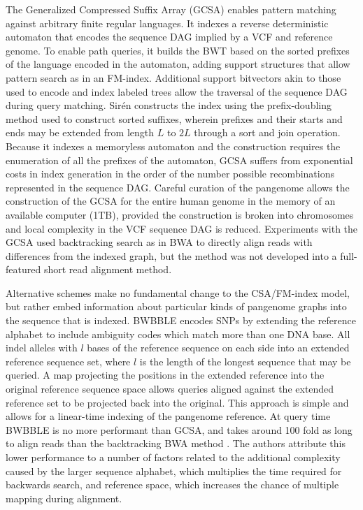 The Generalized Compressed Suffix Array (GCSA) \cite{siren2011indexing,siren2014indexing} enables pattern matching against arbitrary finite regular languages.
It indexes a reverse deterministic automaton that encodes the sequence DAG implied by a VCF and reference genome.
To enable path queries, it builds the BWT based on the sorted prefixes of the language encoded in the automaton, adding support structures that allow pattern search as in an FM-index.
Additional support bitvectors akin to those used to encode and index labeled trees \cite{ferragina2005structuring} allow the traversal of the sequence DAG during query matching.
Sir\'{e}n constructs the index using the prefix-doubling method used to construct sorted suffixes, wherein prefixes and their starts and ends may be extended from length $L$ to $2L$ through a sort and join operation.
Because it indexes a memoryless automaton and the construction requires the enumeration of all the prefixes of the automaton, GCSA suffers from exponential costs in index generation in the order of the number possible recombinations represented in the sequence DAG.
Careful curation of the pangenome allows the construction of the GCSA for the entire human genome in the memory of an available computer (1TB), provided the construction is broken into chromosomes and local complexity in the VCF sequence DAG is reduced.
Experiments with the GCSA used backtracking search as in BWA \cite{li2009fast} to directly align reads with differences from the indexed graph, but the method was not developed into a full-featured short read alignment method.

Alternative schemes make no fundamental change to the CSA/FM-index model, but rather embed information about particular kinds of pangenome graphs into the sequence that is indexed.
BWBBLE \cite{huang2013short} encodes SNPs by extending the reference alphabet to include ambiguity codes which match more than one DNA base.
All indel alleles with $l$ bases of the reference sequence on each side into an extended reference sequence set, where $l$ is the length of the longest sequence that may be queried.
A map projecting the positions in the extended reference into the original reference sequence space allows queries aligned against the extended reference set to be projected back into the original.
This approach is simple and allows for a linear-time indexing of the pangenome reference.
At query time BWBBLE is no more performant than GCSA, and takes around 100 fold as long to align reads than the backtracking BWA method \cite{huang2013short}.
The authors attribute this lower performance to a number of factors related to the additional complexity caused by the larger sequence alphabet, which multiplies the time required for backwards search, and reference space, which increases the chance of multiple mapping during alignment.

